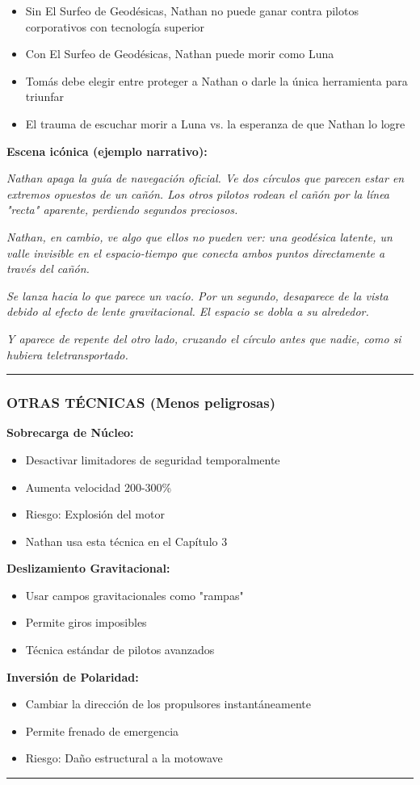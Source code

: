 \documentclass[11pt,a4paper]{report}
\begin{document}
\begin{itemize}
  \item Sin El Surfeo de Geodésicas, Nathan no puede ganar contra pilotos corporativos con tecnología superior
  \item Con El Surfeo de Geodésicas, Nathan puede morir como Luna
  \item Tomás debe elegir entre proteger a Nathan o darle la única herramienta para triunfar
  \item El trauma de escuchar morir a Luna vs. la esperanza de que Nathan lo logre

\end{itemize}
\textbf{Escena icónica (ejemplo narrativo):}

\textit{Nathan apaga la guía de navegación oficial. Ve dos círculos que parecen estar en extremos opuestos de un cañón. Los otros pilotos rodean el cañón por la línea "recta" aparente, perdiendo segundos preciosos.}

\textit{Nathan, en cambio, ve algo que ellos no pueden ver: una geodésica latente, un valle invisible en el espacio-tiempo que conecta ambos puntos directamente a través del cañón.}

\textit{Se lanza hacia lo que parece un vacío. Por un segundo, desaparece de la vista debido al efecto de lente gravitacional. El espacio se dobla a su alrededor.}

\textit{Y aparece de repente del otro lado, cruzando el círculo antes que nadie, como si hubiera teletransportado.}

\bigskip\hrule\bigskip

\subsubsection{OTRAS TÉCNICAS (Menos peligrosas)}

\textbf{Sobrecarga de Núcleo:}
\begin{itemize}
  \item Desactivar limitadores de seguridad temporalmente
  \item Aumenta velocidad 200-300\%
  \item Riesgo: Explosión del motor
  \item Nathan usa esta técnica en el Capítulo 3

\end{itemize}
\textbf{Deslizamiento Gravitacional:}
\begin{itemize}
  \item Usar campos gravitacionales como "rampas"
  \item Permite giros imposibles
  \item Técnica estándar de pilotos avanzados

\end{itemize}
\textbf{Inversión de Polaridad:}
\begin{itemize}
  \item Cambiar la dirección de los propulsores instantáneamente
  \item Permite frenado de emergencia
  \item Riesgo: Daño estructural a la motowave

\end{itemize}
\bigskip\hrule\bigskip
\end{document}
